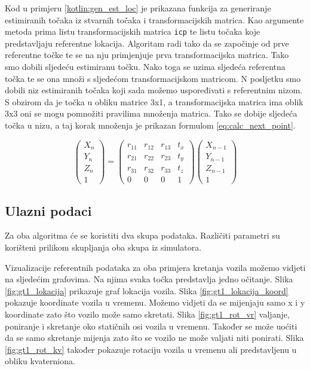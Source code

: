 Kod u primjeru \ref{kotlin:gen_est_loc} je prikazana funkcija za generiranje estimiranih točaka iz stvarnih točaka i transformacijskih matrica. Kao argumente metoda prima listu transformacijskih matrica \texttt{icp} te listu točaka koje predstavljaju referentne lokacija. Algoritam radi tako da se započinje od prve referentne točke te se na nju primjenjuje prva transformacijska matrica. Tako smo dobili sljedeću estimiranu točku. Nako toga se uzima sljedeća referentna točka te se ona množi s sljedećom transformacijskom matricom. N posljetku smo dobili niz estimiranih točaka koji sada možemo uspoređivati s referentnim nizom. S obzirom da je točka u obliku matrice 3x1, a transformacijska matrica ima oblik 3x3 oni se mogu pomnožiti pravilima množenja matrica. Tako se dobije sljedeća točka u nizu, a taj korak množenja je prikazan formulom \ref{eq:calc_next_point}.

\begin{equation}
  \begin{pmatrix}
  X_{n}\\
  Y_{n}\\
  Z_{n}\\
  1
  \end{pmatrix}
  =
  \begin{pmatrix}
    r_{11} & r_{12} & r_{13} & t_{x}\\
    r_{21} & r_{22} & r_{23} & t_{y}\\
    r_{31} & r_{32} & r_{33} & t_{z}\\
    0      & 0      & 0      & 1
  \end{pmatrix}
  \begin{pmatrix}
    X_{n-1}\\
    Y_{n-1}\\
    Z_{n-1}\\
    1
  \end{pmatrix}
  \label{eq:calc_next_point}
\end{equation}

\subsection{Ulazni podaci}

Za oba algoritma će se koristiti dva skupa podataka. Različiti parametri su korišteni prilikom skupljanja oba skupa iz simulatora.

Vizualizacije referentnih podataka za oba primjera kretanja vozila možemo vidjeti na sljedećim grafovima. Na njima svaka točka predstavlja jedno očitanje. Slika \ref{fig:gt1_lokacija} prikazuje graf lokacija vozila. Slika \ref{fig:gt1_lokacija_koord} pokazuje koordinate vozila u vremenu. Možemo vidjeti da se mijenjaju samo x i y koordinate zato što vozilo može samo skretati. Slika \ref{fig:gt1_rot_vr} valjanje, poniranje i skretanje oko statičnih osi vozila u vremenu. Također se može uoćiti da se samo skretanje mijenja zato što se vozilo ne može valjati niti ponirati. Slika \ref{fig:gt1_rot_kv} također pokazuje rotaciju vozila u vremenu ali predstavljenu u obliku kvaterniona. 

